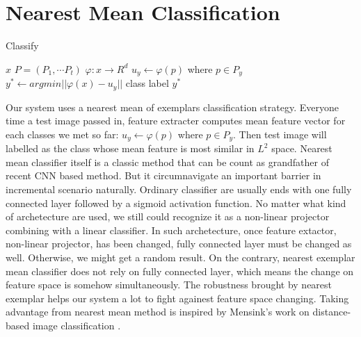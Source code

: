 \documentclass[12pt]{report}
\begin{document}
\section{Nearest Mean Classification}
\begin{algorithm}
	\caption{Classify}
	\begin{algorithmic}[1]
        \REQUIRE $x$
        \REQUIRE $P = \left(P_{1},\cdots P_{t} \right)$
        \REQUIRE $\varphi: x \rightarrow R^{d}$
        \STATE $u_{y} \leftarrow \varphi \left( p \right)$ where $p \in P_{y}$
        \ENDFOR
        \STATE $y^{*} \leftarrow argmin ||\varphi \left( x \right) - u_{y}||$
        \ENSURE class label $y^{*}$
	\end{algorithmic}
\end{algorithm}
\par Our system uses a nearest mean of exemplars classification strategy. Everyone time a test image passed in, feature extracter computes mean feature vector for each classes we met so far: $u_{y} \leftarrow \varphi \left( p \right)$ where $p \in P_{y}$. Then test image will labelled as the class whose mean feature is most similar in $L^{2}$ space. Nearest mean classifier itself is a classic method that can be count as grandfather of recent CNN based method. But it circumnavigate an important barrier in incremental scenario naturally. Ordinary classifier are usually ends with one fully connected layer followed by a sigmoid activation function. No matter what kind of archetecture are used, we still could recognize it as a non-linear projector combining with a linear classifier. In such archetecture, once feature extactor, non-linear projector, has been changed, fully connected layer must be changed as well. Otherwise, we might get a random result. On the contrary, nearest exemplar mean classifier does not rely on fully connected layer, which means the change on feature space is somehow simultaneously. The robustness brought by nearest exemplar helps our system a lot to fight againest feature space changing. Taking advantage from nearest mean method is inspired by Mensink's work on distance-based image classification \cite{near}.
\end{document}
